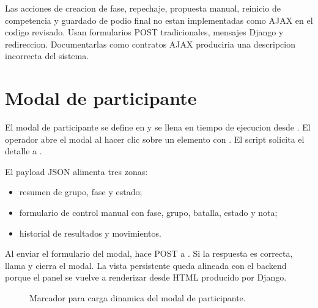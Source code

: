 \begin{advertencia}
Las acciones de creacion de fase, repechaje, propuesta manual, reinicio de competencia y guardado de podio final no estan implementadas como AJAX en el codigo revisado. Usan formularios POST tradicionales, mensajes Django y redireccion. Documentarlas como contratos AJAX produciria una descripcion incorrecta del sistema.
\end{advertencia}

\section{Modal de participante}
\label{sec:javascript-modal-participante}

El modal de participante se define en  y se llena en tiempo de ejecucion desde . El operador abre el modal al hacer clic sobre un elemento  con . El script solicita el detalle a .

El payload JSON alimenta tres zonas:

\begin{itemize}
  \item resumen de grupo, fase y estado;
  \item formulario de control manual con fase, grupo, batalla, estado y nota;
  \item historial de resultados y movimientos.
\end{itemize}

Al enviar el formulario del modal,  hace POST a . Si la respuesta es correcta, llama  y cierra el modal. La vista persistente queda alineada con el backend porque el panel se vuelve a renderizar desde HTML producido por Django.

\begin{figure}[H]
  \centering
  \caption{Marcador para carga dinamica del modal de participante.}
  \label{fig:javascript-modal-participante}
\end{figure}

